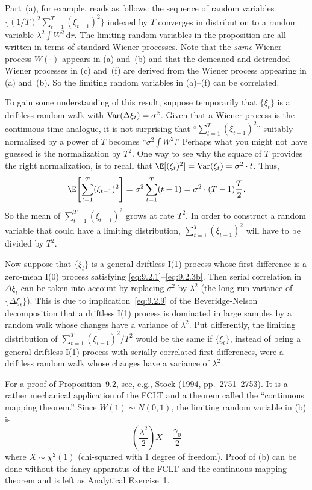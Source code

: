 Part~(a), for example, reads as follows: the sequence of random variables $\{(1/T)^2
\sum_{t=1}^T (\xi_{t-1})^2\}$ indexed by $T$ converges in distribution to a random variable $\lambda^2 \int W^2\,
\mathrm{d}r$. The limiting random variables in the proposition are all written in terms of
standard Wiener processes. Note that the \emph{same} Wiener process $W(\cdot)$ appears in
(a) and~(b) and that the demeaned and detrended Wiener processes in (c) and~(f) are
derived from the Wiener process appearing in (a) and~(b). So the limiting random
variables in (a)--(f) can be correlated.

To gain some understanding of this result, suppose temporarily that $\{\xi_t\}$ is
a driftless random walk with $\operatorname{Var}(\Delta \xi_t) = \sigma^2$. Given that a Wiener process is
the continuous-time analogue, it is not surprising that ``$\sum_{t=1}^T (\xi_{t-1})^2$'' suitably normalized by a power of $T$ becomes ``$\sigma^2 \int W^2$.'' Perhaps what you might not have
guessed is the normalization by $T^2$. One way to see why the square of $T$ provides
the right normalization, is to recall that $\E[(\xi_t)^2] = \Var(\xi_t) = \sigma^2 \cdot t$. Thus,
\begin{equation}
\label{eq:9.2.18}
\E\!\left[\sum_{t=1}^{T} (\xi_{t-1})^2\right]
= \sigma^2 \sum_{t=1}^{T} (t-1)
= \sigma^2 \cdot (T-1) \frac{T}{2}.
\end{equation}
So the mean of $\sum_{t=1}^T (\xi_{t-1})^2$ grows at rate $T^2$. In order to construct a random
variable that could have a limiting distribution, $\sum_{t=1}^T (\xi_{t-1})^2$ will have to be divided
by $T^2$.

Now suppose that $\{\xi_t\}$ is a general driftless I(1) process whose first difference
is a zero-mean I(0) process satisfying \eqref{eq:9.2.1}--\eqref{eq:9.2.3b}. Then serial correlation in
$\Delta \xi_t$ can be taken into account by replacing $\sigma^2$ by $\lambda^2$ (the long-run variance of
$\{\Delta \xi_t\}$). This is due to implication~\eqref{eq:9.2.9} of the Beveridge-Nelson decomposition that a driftless I(1) process is dominated in large samples by a random walk
whose changes have a variance of $\lambda^2$. Put differently, the limiting distribution of
$\sum_{t=1}^T (\xi_{t-1})^2 / T^2$ would be the same if $\{\xi_t\}$, instead of being a general driftless
I(1) process with serially correlated first differences, were a driftless random walk
whose changes have a variance of $\lambda^2$.

For a proof of Proposition~9.2, see, e.g., Stock (1994, pp.~2751--2753). It is a
rather mechanical application of the FCLT and a theorem called the ``continuous
mapping theorem.'' Since $W(1) \sim N(0, 1)$, the limiting random variable in (b) is
\begin{equation}
\label{eq:9.2.19}
\left(\frac{\lambda^2}{2}\right) X - \frac{\gamma_0}{2}
\end{equation}
where $X \sim \chi^2(1)$ (chi-squared with 1 degree of freedom). Proof of (b) can be done
without the fancy apparatus of the FCLT and the continuous mapping theorem and
is left as Analytical Exercise~1.

